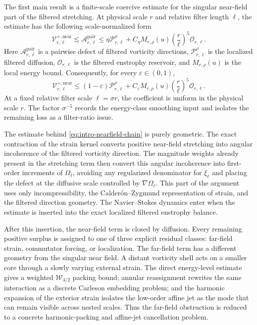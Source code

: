 \documentclass[11pt]{article}
\numberwithin{equation}{section}
\theoremstyle{plain}
\theoremstyle{definition}
\theoremstyle{remark}
\newcommand{\eps}{\varepsilon}
\begin{document}
The first main result is a finite-scale coercive estimate for the singular near-field part of the filtered stretching.  At physical scale $r$ and relative filter length $\ell$, the estimate has the following scale-normalized form
\begin{equation}\label{eq:intro-nearfield-chain}
\mathcal V_{r,\ell}^{+,\mathrm{near}}
\lesssim
\mathcal A_{r,\ell}^{\mathrm{pair}}
\le
\eta\mathcal P_{r,\ell}^{\rho}
+
C_\eta M_{r,\rho}(u)
\left(\frac r\ell\right)^5
\mathcal O_{r,\ell}.
\end{equation}
Here $\mathcal A_{r,\ell}^{\mathrm{pair}}$ is a pairwise defect of filtered vorticity directions, $\mathcal P_{r,\ell}^{\rho}$ is the localized filtered diffusion, $\mathcal O_{r,\ell}$ is the filtered enstrophy reservoir, and $M_{r,\rho}(u)$ is the local energy bound.  Consequently, for every $\eps\in(0,1)$,
\begin{equation}\label{eq:intro-final}
\mathcal V_{r,\ell}^{+,\mathrm{near}}
\le
(1-\eps)\mathcal P_{r,\ell}^{\rho}
+
C_\eps M_{r,\rho}(u)
\left(\frac r\ell\right)^5
\mathcal O_{r,\ell}.
\end{equation}
At a fixed relative filter scale $\ell=\sigma r$, the coefficient is uniform in the physical scale $r$.  The factor $\sigma^{-5}$ records the energy-class smoothing input and isolates the remaining loss as a filter-ratio issue.

The estimate behind \eqref{eq:intro-nearfield-chain} is purely geometric.  The exact contraction of the strain kernel converts positive near-field stretching into angular incoherence of the filtered vorticity direction.  The magnitude weights already present in the stretching term then convert this angular incoherence into first-order increments of $\Omega_\ell$, avoiding any regularized denominator for $\xi_\ell$ and placing the defect at the diffusive scale controlled by $\nabla\Omega_\ell$.  This part of the argument uses only incompressibility, the Calder\'on--Zygmund representation of strain, and the filtered direction geometry.  The Navier--Stokes dynamics enter when the estimate is inserted into the exact localized filtered enstrophy balance.

After this insertion, the near-field term is closed by diffusion.  Every remaining positive surplus is assigned to one of three explicit residual classes: far-field strain, commutator forcing, or localization.  The far-field term has a different geometry from the singular near field.  A distant vorticity shell acts on a smaller core through a slowly varying external strain.  The direct energy-level estimate gives a weighted $\mathcal W_{3/2}$ packing bound; annular reassignment rewrites the same interaction as a discrete Carleson embedding problem; and the harmonic expansion of the exterior strain isolates the low-order affine jet as the mode that can remain visible across nested scales.  Thus the far-field obstruction is reduced to a concrete harmonic-packing and affine-jet cancellation problem.
\end{document}
